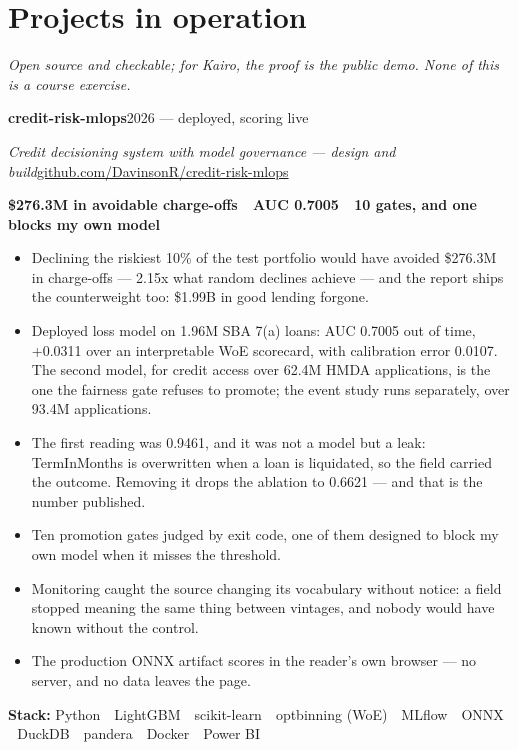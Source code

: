 \documentclass[a4paper,10pt]{article}
\newcommand{\headline}[2]{\needspace{3\baselineskip}\textbf{\color{ink}#1}\hfill{\small #2}\par}
\newcommand{\subline}[2]{\textit{#1}\hfill{\small #2}\par}
\begin{document}
\section*{Projects in operation}
{\small\itshape Open source and checkable; for Kairo, the proof is the public demo. None of this is a course exercise.}\par\vspace{3pt}
\headline{credit-risk-mlops}{2026 --- deployed, scoring live}
\subline{Credit decisioning system with model governance --- design and build}{\href{https://github.com/DavinsonR/credit-risk-mlops}{github.com/DavinsonR/credit-risk-mlops}}
{\small\bfseries\color{cold} \$276.3M in avoidable charge-offs \,\textperiodcentered\, AUC 0.7005 \,\textperiodcentered\, 10 gates, and one blocks my own model}\par
\begin{itemize}[leftmargin=1.1em, itemsep=0pt, topsep=1pt, parsep=0pt]
  \item Declining the riskiest 10\% of the test portfolio would have avoided \$276.3M in charge-offs --- 2.15x what random declines achieve --- and the report ships the counterweight too: \$1.99B in good lending forgone.
  \item Deployed loss model on 1.96M SBA 7(a) loans: AUC 0.7005 out of time, +0.0311 over an interpretable WoE scorecard, with calibration error 0.0107. The second model, for credit access over 62.4M HMDA applications, is the one the fairness gate refuses to promote; the event study runs separately, over 93.4M applications.
  \item The first reading was 0.9461, and it was not a model but a leak: TermInMonths is overwritten when a loan is liquidated, so the field carried the outcome. Removing it drops the ablation to 0.6621 --- and that is the number published.
  \item Ten promotion gates judged by exit code, one of them designed to block my own model when it misses the threshold.
  \item Monitoring caught the source changing its vocabulary without notice: a field stopped meaning the same thing between vintages, and nobody would have known without the control.
  \item The production ONNX artifact scores in the reader's own browser --- no server, and no data leaves the page.
\end{itemize}
{\small\textbf{Stack:} Python \,\textperiodcentered\, LightGBM \,\textperiodcentered\, scikit-learn \,\textperiodcentered\, optbinning (WoE) \,\textperiodcentered\, MLflow \,\textperiodcentered\, ONNX \,\textperiodcentered\, DuckDB \,\textperiodcentered\, pandera \,\textperiodcentered\, Docker \,\textperiodcentered\, Power BI}\par
\end{document}
